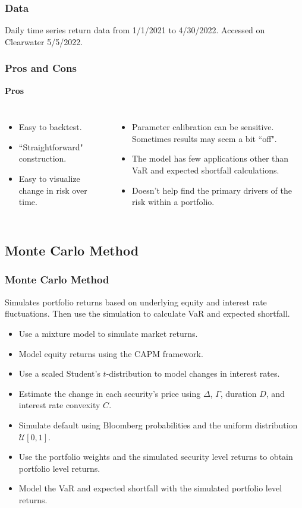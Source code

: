 \documentclass{beamer}
\begin{document}
\begin{frame}
\frametitle{Data}

Daily time series return data from 1/1/2021 to 4/30/2022. Accessed on Clearwater 5/5/2022.

\end{frame}


\begin{frame}
\frametitle{Pros and Cons}

{\bf Pros}\hspace{0.5\textwidth}{\bf Cons}

\begin{columns}
\begin{itemize}
\item Easy to backtest. 
\item ``Straightforward" construction.
\item Easy to visualize change in risk over time.
\end{itemize}
\begin{itemize}
\item Parameter calibration can be sensitive. Sometimes results may seem a bit ``off".
\item The model has few applications other than VaR and expected shortfall calculations. 
\item Doesn't help find the primary drivers of the risk within a portfolio.
\end{itemize}
\end{columns}

\end{frame}


\subsection{Monte Carlo Method}

\begin{frame}
\frametitle{Monte Carlo Method}
Simulates portfolio returns based on underlying equity and interest rate fluctuations. Then use the simulation to calculate VaR and expected shortfall.
\begin{itemize}
\item Use a mixture model to simulate market returns.
\item Model equity returns using the CAPM framework. 
\item Use a scaled Student's $t$-distribution to model changes in interest rates.
\item Estimate the change in each security's price using $\Delta$, $\Gamma$, duration $D$, and interest rate convexity $C$. 
\item Simulate default using Bloomberg probabilities and the uniform distribution $\mathcal{U}[0, 1]$. 
\item Use the portfolio weights and the simulated security level returns to obtain portfolio level returns.
\item Model the VaR and expected shortfall with the simulated portfolio level returns.
\end{itemize}
\end{frame}
\end{document}
